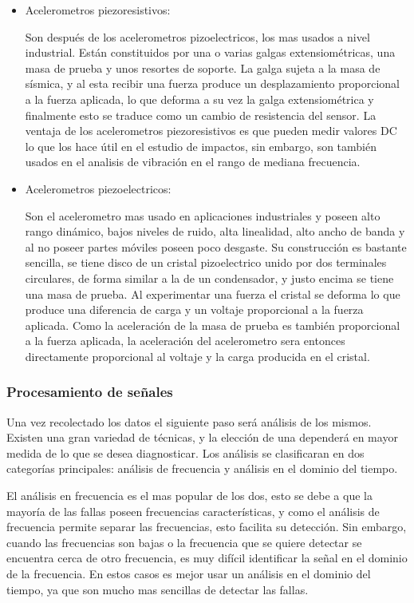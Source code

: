 \begin{itemize}
\item  Acelerometros piezoresistivos:

Son después de los acelerometros pizoelectricos, los mas usados a nivel
industrial. Están constituidos por una o varias galgas extensiométricas, una
masa de prueba y unos resortes de soporte. La galga sujeta a la masa de
sísmica, y al esta recibir una fuerza produce un desplazamiento proporcional a
la fuerza aplicada, lo que deforma a su vez la galga extensiométrica y
finalmente esto se traduce como un cambio de resistencia del sensor. La ventaja
de los acelerometros piezoresistivos es que pueden medir valores DC lo que los
hace útil en el estudio de impactos, sin embargo, son también usados en el
analisis de vibración en el rango de mediana frecuencia.

\item Acelerometros piezoelectricos:

Son el acelerometro mas usado en aplicaciones industriales y poseen alto rango
dinámico, bajos niveles de ruido, alta linealidad, alto ancho de banda y al no
poseer partes móviles poseen poco desgaste. Su construcción es bastante
sencilla, se tiene disco de un cristal pizoelectrico unido por dos terminales
circulares, de forma similar a la de un condensador, y justo encima se tiene
una masa de prueba. Al experimentar una fuerza el cristal se deforma lo que
produce una diferencia de carga y un voltaje proporcional a la fuerza aplicada.
Como la aceleración de la masa de prueba es también proporcional a la fuerza
aplicada, la aceleración del acelerometro sera entonces directamente
proporcional al voltaje y la carga producida en el cristal.

\end{itemize}

\subsubsection{Procesamiento de señales}

Una vez recolectado los datos el siguiente paso será análisis de los mismos.
Existen una gran variedad de técnicas, y la elección de una dependerá en mayor
medida de lo que se desea diagnosticar. Los análisis se clasificaran en dos
categorías principales: análisis de frecuencia y análisis en el dominio del
tiempo.

El análisis en frecuencia es el mas popular de los dos, esto se debe a
que la mayoría de las fallas poseen frecuencias características, y como el
análisis de frecuencia permite separar las frecuencias, esto facilita su
detección. Sin embargo, cuando las frecuencias son bajas o la frecuencia que se
quiere detectar se encuentra cerca de otro frecuencia, es muy difícil
identificar la señal en el dominio de la frecuencia. En estos casos es mejor
usar un análisis en el dominio del tiempo, ya que son mucho mas sencillas de
detectar las fallas.

